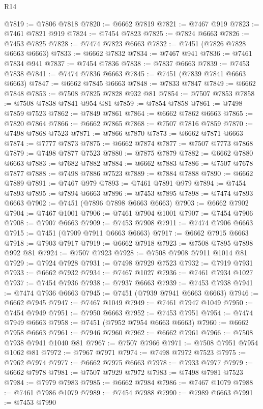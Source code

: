\begin{lexlean}{R14}
\begin{coremodule}
@7819 := @7806 @7818
@7820 := @6662 @7819
@7821 := @7467 @919
@7823 := @7461 @7821 @919
@7824 := @7454 @7823
@7825 := @7824 @6663
@7826 := @7453 @7825
@7828 := @7474 @7823 @6663
@7832 := @7451 (@7826 @7828 @6663 @6663)
@7833 := @6662 @7832
@7834 := @7467 @941
@7836 := @7461 @7834 @941
@7837 := @7454 @7836
@7838 := @7837 @6663
@7839 := @7453 @7838
@7841 := @7474 @7836 @6663
@7845 := @7451 (@7839 @7841 @6663 @6663)
@7847 := @6662 @7845 @6663
@7848 := @7833 @7847
@7849 := @6662 @7848
@7853 := @7508 @7825 @7828 @932 @81
@7854 := @7507 @7853
@7858 := @7508 @7838 @7841 @954 @81
@7859 := @7854 @7858
@7861 := @7498 @7859 @7523
@7862 := @7849 @7861
@7864 := @6662 @7862 @6663
@7865 := @7820 @7864
@7866 := @6662 @7865
@7868 := @7507 @7816 @7859
@7870 := @7498 @7868 @7523
@7871 := @7866 @7870
@7873 := @6662 @7871 @6663
@7874 := @7777 @7873
@7875 := @6662 @7874
@7877 := @7507 @7773 @7868
@7879 := @7498 @7877 @7523
@7880 := @7875 @7879
@7882 := @6662 @7880 @6663
@7883 := @7682 @7882
@7884 := @6662 @7883
@7886 := @7507 @7678 @7877
@7888 := @7498 @7886 @7523
@7889 := @7884 @7888
@7890 := @6662 @7889
@7891 := @7467 @979
@7893 := @7461 @7891 @979
@7894 := @7454 @7893
@7895 := @7894 @6663
@7896 := @7453 @7895
@7898 := @7474 @7893 @6663
@7902 := @7451 (@7896 @7898 @6663 @6663)
@7903 := @6662 @7902
@7904 := @7467 @1001
@7906 := @7461 @7904 @1001
@7907 := @7454 @7906
@7908 := @7907 @6663
@7909 := @7453 @7908
@7911 := @7474 @7906 @6663
@7915 := @7451 (@7909 @7911 @6663 @6663)
@7917 := @6662 @7915 @6663
@7918 := @7903 @7917
@7919 := @6662 @7918
@7923 := @7508 @7895 @7898 @992 @81
@7924 := @7507 @7923
@7928 := @7508 @7908 @7911 @1014 @81
@7929 := @7924 @7928
@7931 := @7498 @7929 @7523
@7932 := @7919 @7931
@7933 := @6662 @7932
@7934 := @7467 @1027
@7936 := @7461 @7934 @1027
@7937 := @7454 @7936
@7938 := @7937 @6663
@7939 := @7453 @7938
@7941 := @7474 @7936 @6663
@7945 := @7451 (@7939 @7941 @6663 @6663)
@7946 := @6662 @7945
@7947 := @7467 @1049
@7949 := @7461 @7947 @1049
@7950 := @7454 @7949
@7951 := @7950 @6663
@7952 := @7453 @7951
@7954 := @7474 @7949 @6663
@7958 := @7451 (@7952 @7954 @6663 @6663)
@7960 := @6662 @7958 @6663
@7961 := @7946 @7960
@7962 := @6662 @7961
@7966 := @7508 @7938 @7941 @1040 @81
@7967 := @7507 @7966
@7971 := @7508 @7951 @7954 @1062 @81
@7972 := @7967 @7971
@7974 := @7498 @7972 @7523
@7975 := @7962 @7974
@7977 := @6662 @7975 @6663
@7978 := @7933 @7977
@7979 := @6662 @7978
@7981 := @7507 @7929 @7972
@7983 := @7498 @7981 @7523
@7984 := @7979 @7983
@7985 := @6662 @7984
@7986 := @7467 @1079
@7988 := @7461 @7986 @1079
@7989 := @7454 @7988
@7990 := @7989 @6663
@7991 := @7453 @7990

\end{coremodule}
\end{lexlean}
